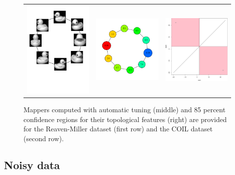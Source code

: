 \begin{figure}
\begin{tabular}{ccc}
\includegraphics[width=5cm]{figures/coil1} & \includegraphics[width=5cm]{figures/coil1_mapperPCA1_subs100_g40.pdf} & \includegraphics[width=5cm]{figures/coil1_conf85_boot100.pdf} 
\end{tabular}
\caption[Automatic Mappers on real-world datasets]{\label{fig:realapp} Mappers computed with automatic tuning (middle) and 85 percent confidence regions for their topological features (right) are provided for
 the Reaven-Miller dataset (first row) and the COIL dataset (second row). }

\end{figure}



\subsection{Noisy data}\label{sec:noise}

